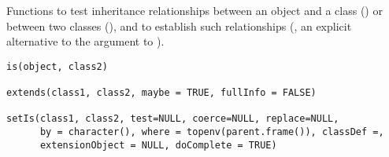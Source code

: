 %
\begin{Description}\relax
Functions to test inheritance relationships between an object and a
class () or between two classes (), and to
establish such relationships (, an explicit alternative
to the  argument to ).
\end{Description}
%
\begin{Usage}
\begin{verbatim}
is(object, class2)

extends(class1, class2, maybe = TRUE, fullInfo = FALSE)

setIs(class1, class2, test=NULL, coerce=NULL, replace=NULL,
      by = character(), where = topenv(parent.frame()), classDef =,
      extensionObject = NULL, doComplete = TRUE)
\end{verbatim}
\end{Usage}
%
